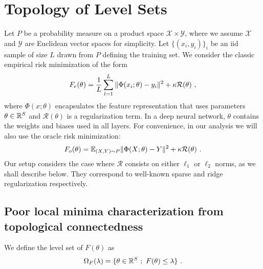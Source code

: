 \section{Topology of Level Sets}

Let $P$ be a probability measure on a product space $\mathcal{X} \times \mathcal{Y}$, 
where we assume $\mathcal{X}$ and $\mathcal{Y}$ are Euclidean vector spaces for simplicity.
Let $\{ (x_i, y_i)\}_i$ be an iid sample of size $L$ drawn from $P$ defining the training set.
We consider the classic empirical risk minimization of the form
\begin{equation}
\label{emp_risk_min}
F_{e}(\theta) = \frac{1}{L} \sum_{l=1}^L \| \Phi(x_i;\theta) - y_i \|^2 + \kappa \mathcal{R}(\theta)~,
\end{equation}
where $\Phi(x ; \theta)$ encapsulates the feature representation 
that uses parameters $\theta \in {\mathbb{R}}^S$ and $\mathcal{R}(\theta)$ is a regularization term. 
 In a deep neural network, $\theta$
contains the weights and biases used in all layers.
For convenience, in our analysis we will also use the oracle risk minimization:
\begin{equation}
\label{risk_min}
F_{o}(\theta) = {\mathbb{E}}_{(X,Y) \sim P} \| \Phi(X;\theta) - Y \|^2 + \kappa \mathcal{R}(\theta)~.
\end{equation}
Our setup considers the case where $\mathcal{R}$ 
consists on either $\ell_1$ or $\ell_2$ norms, as we shall describe below.
They correspond to well-known sparse and ridge regularization respectively.
%

\subsection{Poor local minima characterization from topological connectedness}

We define the level set of $F(\theta)$ as 
\begin{equation}
\Omega_F(\lambda) = \{ \theta \in {\mathbb{R}}^S~;~F(\theta) \leq \lambda \}~. 
\end{equation}

